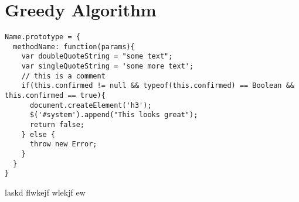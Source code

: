 \documentclass{book}
\begin{document}
\section{Greedy Algorithm}

\medskip
\begin{lstlisting}[caption=My Javascript Example]
Name.prototype = {
  methodName: function(params){
    var doubleQuoteString = "some text";
    var singleQuoteString = 'some more text';
    // this is a comment
    if(this.confirmed != null && typeof(this.confirmed) == Boolean && this.confirmed == true){
      document.createElement('h3');
      $('#system').append("This looks great");
      return false;
    } else {
      throw new Error;
    }
  }
}
\end{lstlisting}
laskd flwkejf wlekjf ew
\end{document}
